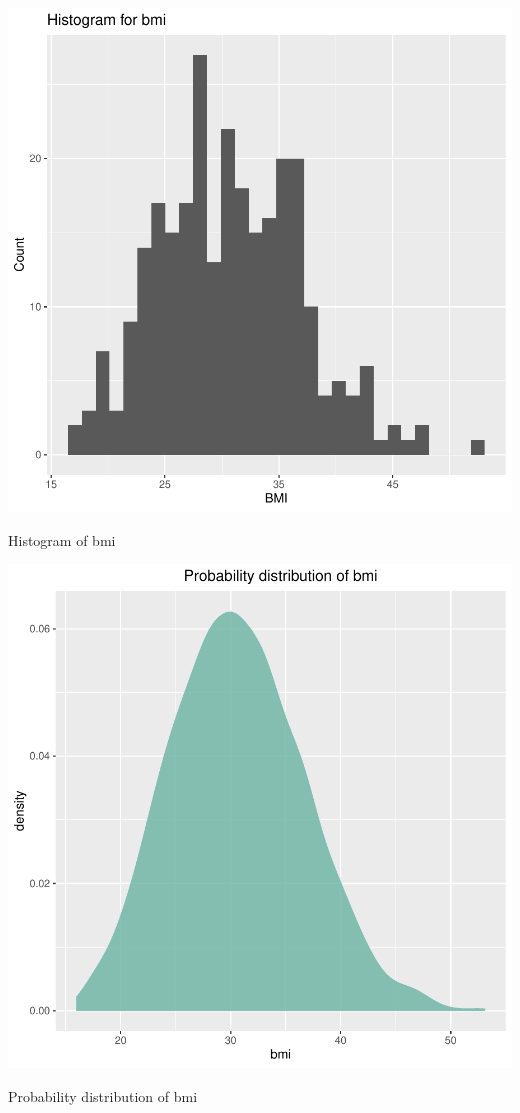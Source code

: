 \documentclass{article}
\begin{document}
\begin{centerfig}
\includegraphics{Untitled-021}
\caption{Histogram of bmi}
\end{centerfig}

\begin{centerfig}
\includegraphics{Untitled-022}
\caption{Probability distribution of bmi}
\end{centerfig}
\end{document}
